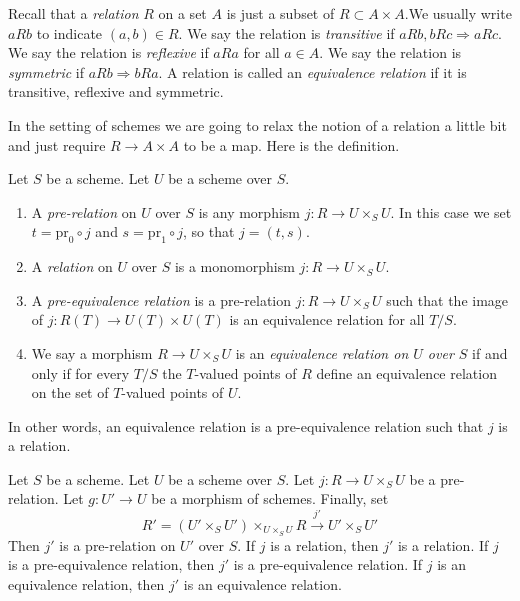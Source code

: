 \noindent
Recall that a {\it relation} $R$ on a set $A$ is just a subset
of $R \subset A \times A$.We usually write $a R b$ to indicate
$(a, b) \in R$. We say the relation is {\it transitive} if
$a R b, b R c \Rightarrow a R c$. We say the relation is
{\it reflexive} if $a R a$ for all $a \in A$. We say the relation is
{\it symmetric} if $a R b \Rightarrow b R a$.
A relation is called an {\it equivalence relation} if
it is transitive, reflexive and symmetric.

\medskip\noindent
In the setting of schemes we are going to relax the notion of a
relation a little bit and just require $R \to A \times A$ to
be a map. Here is the definition.

\begin{definition}
\label{definition-equivalence-relation}
Let $S$ be a scheme. Let $U$ be a scheme over $S$.
\begin{enumerate}
\item A {\it pre-relation} on $U$ over $S$ is any morphism
$j : R \to U \times_S U$. In this case we set
$t = \text{pr}_0 \circ j$ and $s = \text{pr}_1 \circ j$, so
that $j = (t, s)$.
\item A {\it relation} on $U$ over $S$ is a monomorphism
$j : R \to U \times_S U$.
\item A {\it pre-equivalence relation} is a pre-relation
$j : R \to U\times_SU$ such that the image of
$j : R(T) \to U(T) \times U(T)$ is an equivalence relation for
all $T/S$.
\item We say a morphism $R \to U \times_S U$ is
an {\it equivalence relation on $U$ over $S$}
if and only if for every $T/S$ the $T$-valued
points of $R$ define an equivalence relation
on the set of $T$-valued points of $U$.
\end{enumerate}
\end{definition}

\noindent
In other words, an equivalence relation is a pre-equivalence relation
such that $j$ is a relation.

\begin{lemma}
\label{lemma-restrict-relation}
Let $S$ be a scheme.
Let $U$ be a scheme over $S$.
Let $j : R \to U \times_S U$ be a pre-relation.
Let $g : U' \to U$ be a morphism of schemes.
Finally, set
$$
R' = (U' \times_S U')\times_{U \times_S U} R
\xrightarrow{j'}
U' \times_S U'
$$
Then $j'$ is a pre-relation on $U'$ over $S$.
If $j$ is a relation, then $j'$ is a relation.
If $j$ is a pre-equivalence relation, then $j'$ is a pre-equivalence relation.
If $j$ is an equivalence relation, then $j'$ is an equivalence relation.
\end{lemma}

